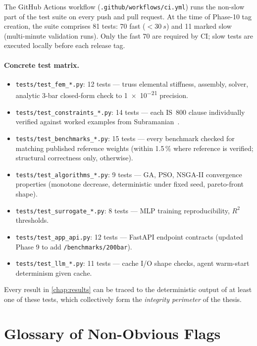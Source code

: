 The GitHub Actions workflow
(\texttt{.github/workflows/ci.yml}) runs the non-slow part of
the test suite on every push and pull request. At the time of
Phase-10 tag creation, the suite comprises \num{81} tests:
\num{70} fast ($<\SI{30}{s}$) and \num{11} marked slow
(multi-minute validation runs). Only the fast \num{70} are
required by CI; slow tests are executed locally before each
release tag.

\paragraph{Concrete test matrix.}
\begin{itemize}
  \item \texttt{tests/test\_fem\_*.py}: 12 tests --- truss
    elemental stiffness, assembly, solver, analytic 3-bar
    closed-form check to \num{1e-21} precision.
  \item \texttt{tests/test\_constraints\_*.py}: 14 tests --- each
    IS~800 clause individually verified against worked examples
    from Subramanian~\cite{subramanian2008}.
  \item \texttt{tests/test\_benchmarks\_*.py}: 15 tests --- every
    benchmark checked for matching published reference weights
    (within \num{1.5}\,\% where reference is verified; structural
    correctness only, otherwise).
  \item \texttt{tests/test\_algorithms\_*.py}: 9 tests --- GA,
    PSO, NSGA-II convergence properties (monotone decrease,
    deterministic under fixed seed, pareto-front shape).
  \item \texttt{tests/test\_surrogate\_*.py}: 8 tests --- MLP
    training reproducibility, $R^2$ thresholds.
  \item \texttt{tests/test\_app\_api.py}: 12 tests --- FastAPI
    endpoint contracts (updated Phase 9 to add
    \texttt{/benchmarks/200bar}).
  \item \texttt{tests/test\_llm\_*.py}: 11 tests --- cache I/O
    shape checks, agent warm-start determinism given cache.
\end{itemize}
Every result in \cref{chap:results} can be traced to the
deterministic output of at least one of these tests, which
collectively form the \emph{integrity perimeter} of the thesis.

\section{Glossary of Non-Obvious Flags}
\label{app:repro:flags}

